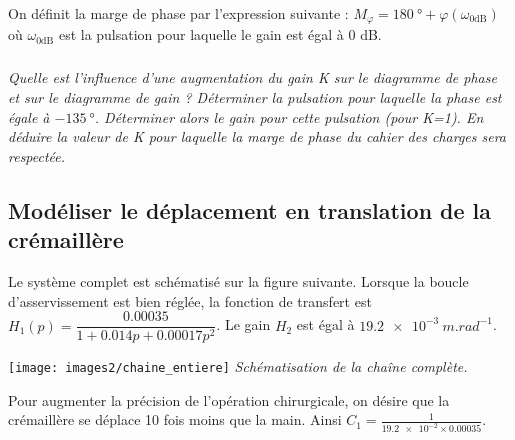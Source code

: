 \documentclass[10pt,fleqn]{article} %
\begin{document}
On définit la marge de phase par l'expression suivante : $M_{\varphi}=\SI{180}{\degree}+\varphi(\omega_{0\text{dB}})$ où $\omega_{0\text{dB}}$ est la pulsation pour laquelle le gain est égal à 0 dB.

\subparagraph{}\textit{Quelle est l'influence d'une augmentation du gain K sur le diagramme de phase et sur le diagramme de gain ? Déterminer la pulsation pour laquelle la phase est égale à $\SI{-135}{\degree}$. Déterminer alors le gain pour cette pulsation (pour K=1). En déduire la valeur de K pour laquelle la marge de phase du cahier des charges sera respectée.}



\subsection{Modéliser le déplacement en translation de la crémaillère\\}

Le système complet est schématisé sur la figure suivante. 
Lorsque la boucle d'asservissement est bien réglée, la fonction de transfert est $H_1(p)=\dfrac{\num{0,00035}}{1+\num{0,014} p + \num{0,00017} p^2}$.
Le gain $H_2$ est égal à $\SI{19,2e-3}{m.rad^{-1}}$. 

\begin{center}%
	\texttt{[image: images2/chaine\_entiere]}
	\textit{Schématisation de la chaîne complète.}
\end{center}

Pour augmenter la précision de l'opération chirurgicale, on désire que la crémaillère se déplace 10 fois moins que la main. Ainsi $C_1=\frac{1}{\num{19,2e-2}\times\num{0,00035}}$.
\end{document}
